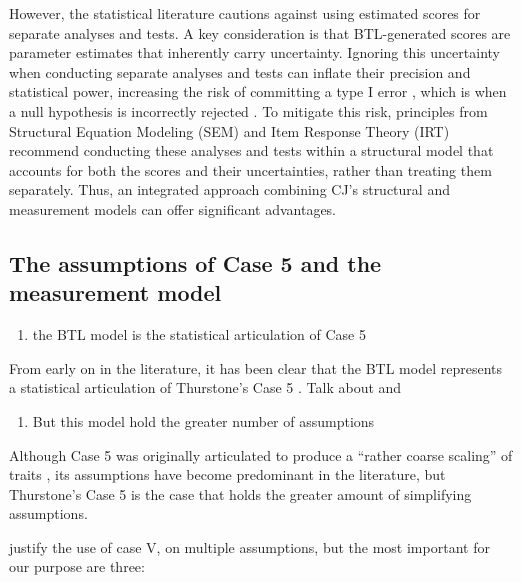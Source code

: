 \documentclass[
  authoryear,
  preprint,
  1p]{elsarticle}
\providecommand{\tightlist}{%
  \setlength{\itemsep}{0pt}\setlength{\parskip}{0pt}}\usepackage{longtable,booktabs,array}
\begin{document}
However, the statistical literature cautions against using estimated
scores for separate analyses and tests. A key consideration is that
BTL-generated scores are parameter estimates that inherently carry
uncertainty. Ignoring this uncertainty when conducting separate analyses
and tests can inflate their precision and statistical power, increasing
the risk of committing a type I error \citep{McElreath_2020}, which is
when a null hypothesis is incorrectly rejected
\citep{Everitt_et_al_2010}. To mitigate this risk, principles from
Structural Equation Modeling (SEM)
\citep{Hoyle_et_al_2023, Kline_et_al_2023} and Item Response Theory
(IRT) \citep{deAyala_2009, Fox_2010, vanderLinden_et_al_2017} recommend
conducting these analyses and tests within a structural model that
accounts for both the scores and their uncertainties, rather than
treating them separately. Thus, an integrated approach combining CJ's
structural and measurement models can offer significant advantages.

\subsection{The assumptions of Case 5 and the measurement
model}\label{the-assumptions-of-case-5-and-the-measurement-model}

\begin{enumerate}
\def\labelenumi{\arabic{enumi}.}
\tightlist
\item
  the BTL model is the statistical articulation of Case 5
\end{enumerate}

From early on in the literature, it has been clear that the BTL model
represents a statistical articulation of Thurstone's Case 5
\citeyearpar{Thurstone_1927}. Talk about \citet{Pollitt_et_al_2003} and
\citet{Bramley_2008}

\begin{enumerate}
\def\labelenumi{\arabic{enumi}.}
\setcounter{enumi}{1}
\tightlist
\item
  But this model hold the greater number of assumptions
\end{enumerate}

Although Case 5 was originally articulated to produce a ``rather coarse
scaling'' of traits \citep[p.~269]{Thurstone_1927}, its assumptions have
become predominant in the literature, but Thurstone's Case 5 is the case
that holds the greater amount of simplifying assumptions.

\citet{Thurstone_1927} justify the use of case V, on multiple
assumptions, but the most important for our purpose are three:
\end{document}
